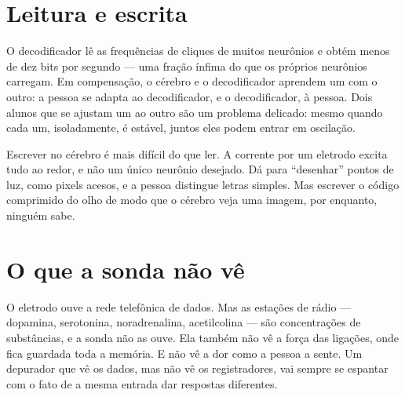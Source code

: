 \section*{Leitura e escrita}

O decodificador lê as frequências de cliques de muitos neurônios e obtém menos de dez bits por segundo --- uma fração ínfima do que os próprios neurônios carregam. Em compensação, o cérebro e o decodificador aprendem um com o outro: a pessoa se adapta ao decodificador, e o decodificador, à pessoa. Dois alunos que se ajustam um ao outro são um problema delicado: mesmo quando cada um, isoladamente, é estável, juntos eles podem entrar em oscilação.

Escrever no cérebro é mais difícil do que ler. A corrente por um eletrodo excita tudo ao redor, e não um único neurônio desejado. Dá para ``desenhar'' pontos de luz, como pixels acesos, e a pessoa distingue letras simples. Mas escrever o código comprimido do olho de modo que o cérebro veja uma imagem, por enquanto, ninguém sabe.

\section*{O que a sonda não vê}

O eletrodo ouve a rede telefônica de dados. Mas as estações de rádio --- dopamina, serotonina, noradrenalina, acetilcolina --- são concentrações de substâncias, e a sonda não as ouve. Ela também não vê a força das ligações, onde fica guardada toda a memória. E não vê a dor como a pessoa a sente. Um depurador que vê os dados, mas não vê os registradores, vai sempre se espantar com o fato de a mesma entrada dar respostas diferentes.

